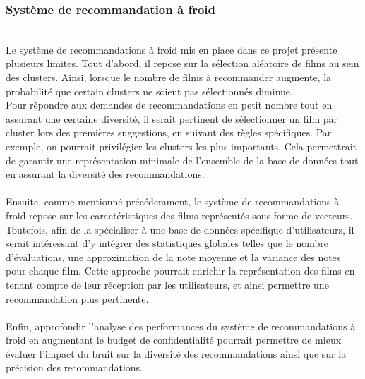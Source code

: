 \documentclass{article}
\begin{document}
\subsubsection{Système de recommandation à froid}
$ $\\
Le système de recommandations à froid mis en place dans ce projet présente plusieurs limites.
Tout d’abord, il repose sur la sélection aléatoire de films au sein des clusters. Ainsi, lorsque
le nombre de films à recommander augmente, la probabilité que certain clusters ne soient pas sélectionnés diminue.\\
Pour répondre aux demandes de recommandations en petit nombre tout en assurant une certaine diversité, il serait pertinent
de sélectionner un film par cluster lors des premières suggestions, en suivant des règles spécifiques. Par exemple, on
pourrait privilégier les clusters les plus importants. Cela permettrait de garantir une représentation minimale de l’ensemble
de la base de données tout en assurant la diversité des recommandations.\\
\\
Ensuite, comme mentionné précédemment, le système de recommandations à froid repose sur les caractéristiques des films représentés sous
forme de vecteurs. Toutefois, afin de la spécialiser à une base de données spécifique d’utilisateurs, il serait intéressant d’y intégrer des
statistiques globales telles que le nombre d’évaluations, une approximation de la note moyenne
et la variance des notes pour chaque film. Cette approche pourrait enrichir la représentation
des films en tenant compte de leur réception par les utilisateurs, et ainsi permettre une recommandation plus pertinente.\\
\\
Enfin, approfondir l'analyse des performances du système de recommandations à froid en augmentant le budget de confidentialité
pourrait permettre de mieux évaluer l'impact du bruit sur la diversité des recommandations ainsi que sur la précision des recommandations.
\end{document}
